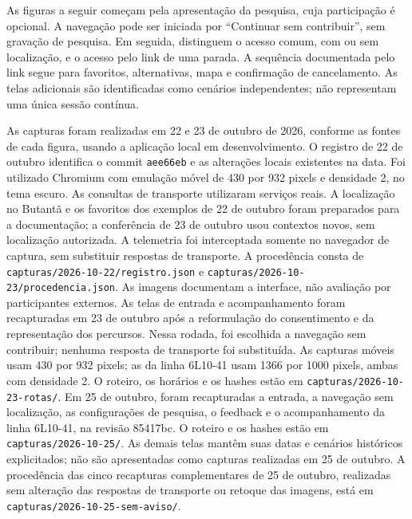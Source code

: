\documentclass[12pt,oneside,a4paper,brazil,chapter=TITLE]{abntex2}
\begin{document}
\clearpage
As figuras a seguir começam pela apresentação da pesquisa, cuja participação é opcional. A navegação pode ser iniciada por ``Continuar sem contribuir'', sem gravação de pesquisa. Em seguida, distinguem o acesso comum, com ou sem localização, e o acesso pelo link de uma parada. A sequência documentada pelo link segue para favoritos, alternativas, mapa e confirmação de cancelamento. As telas adicionais são identificadas como cenários independentes; não representam uma única sessão contínua.

As capturas foram realizadas em 22 e 23 de outubro de 2026, conforme as fontes de cada figura, usando a aplicação local em desenvolvimento. O registro de 22 de outubro identifica o commit \texttt{aee66eb} e as alterações locais existentes na data. Foi utilizado Chromium com emulação móvel de 430 por 932 pixels e densidade 2, no tema escuro. As consultas de transporte utilizaram serviços reais. A localização no Butantã e os favoritos dos exemplos de 22 de outubro foram preparados para a documentação; a conferência de 23 de outubro usou contextos novos, sem localização autorizada. A telemetria foi interceptada somente no navegador de captura, sem substituir respostas de transporte. A procedência consta de \nolinkurl{capturas/2026-10-22/registro.json} e \nolinkurl{capturas/2026-10-23/procedencia.json}. As imagens documentam a interface, não avaliação por participantes externos. As telas de entrada e acompanhamento foram recapturadas em 23 de outubro após a reformulação do consentimento e da representação dos percursos. Nessa rodada, foi escolhida a navegação sem contribuir; nenhuma resposta de transporte foi substituída. As capturas móveis usam 430 por 932 pixels; as da linha 6L10-41 usam 1366 por 1000 pixels, ambas com densidade 2. O roteiro, os horários e os hashes estão em \nolinkurl{capturas/2026-10-23-rotas/}. Em 25 de outubro, foram recapturadas a entrada, a navegação sem localização, as configurações de pesquisa, o feedback e o acompanhamento da linha 6L10-41, na revisão 85417bc. O roteiro e os hashes estão em \nolinkurl{capturas/2026-10-25/}. As demais telas mantêm suas datas e cenários históricos explicitados; não são apresentadas como capturas realizadas em 25 de outubro. A procedência das cinco recapturas complementares de 25 de outubro, realizadas sem alteração das respostas de transporte ou retoque das imagens, está em \nolinkurl{capturas/2026-10-25-sem-aviso/}.
\end{document}
